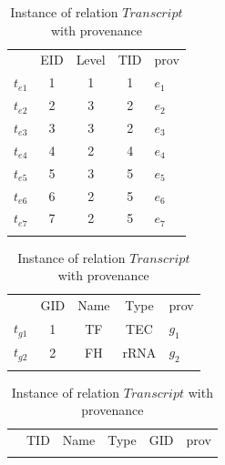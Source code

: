 \begin{example}
\begin{table}[htp]
\centering
\small
\caption{Instance of relation $Exon$ with provenance}\label{Instance of Exon}
\begin{tabular}[t]{c|c|c|c||b|} \hhline{~----}
&EID&Level&TID&prov\\ \hhline{~----}
$t_{e1}$&1&1&1&$e_1$\\ \hhline{~----}
$t_{e2}$&2&3&2&$e_2$\\ \hhline{~----}
$t_{e3}$&3&3&2&$e_3$\\ \hhline{~----}
$t_{e4}$&4&2&4&$e_4$\\ \hhline{~----}
$t_{e5}$&5&3&5&$e_5$\\ \hhline{~----}
$t_{e6}$&6&2&5&$e_6$\\ \hhline{~----}
$t_{e7}$&7&2&5&$e_7$\\ \hhline{~----}
\end{tabular}
\bigskip
\caption{Instance of relation $Gene$ with provenance}\label{Instance of Gene}
\begin{tabular}[t]{c|c|c|c||b|} \hhline{~----}
&GID&Name&Type&prov\\ \hhline{~----}
$t_{g1}$&1&TF&TEC&$g_1$\\ \hhline{~----}
$t_{g2}$&2&FH&rRNA&$g_2$\\ \hhline{~----}
\end{tabular}
\bigskip
\caption{Instance of relation $Transcript$ with provenance}\label{Instance of Transcript}
\begin{tabular}[t]{c|c|c|c|c||b|} \hhline{~-----}
&TID&Name&Type&GID&prov\\ \hhline{~-----}

\end{tabular}
\end{table}
\end{example}
